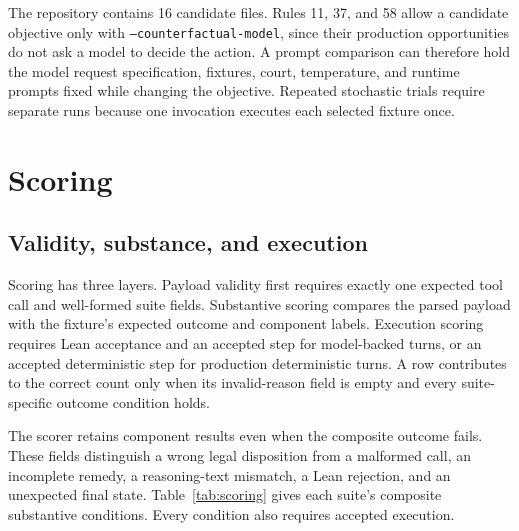 \documentclass[11pt]{article}
\newcommand{\code}[1]{\texttt{#1}}
\begin{document}
The repository contains 16 candidate files.  Rules 11, 37, and 58 allow a candidate objective only with \code{--counterfactual-model}, since their production opportunities do not ask a model to decide the action.  A prompt comparison can therefore hold the model request specification, fixtures, court, temperature, and runtime prompts fixed while changing the objective.  Repeated stochastic trials require separate runs because one invocation executes each selected fixture once.

\section{Scoring}

\subsection{Validity, substance, and execution}

Scoring has three layers.  Payload validity first requires exactly one expected tool call and well-formed suite fields.  Substantive scoring compares the parsed payload with the fixture's expected outcome and component labels.  Execution scoring requires Lean acceptance and an accepted step for model-backed turns, or an accepted deterministic step for production deterministic turns.  A row contributes to the correct count only when its invalid-reason field is empty and every suite-specific outcome condition holds.

The scorer retains component results even when the composite outcome fails.  These fields distinguish a wrong legal disposition from a malformed call, an incomplete remedy, a reasoning-text mismatch, a Lean rejection, and an unexpected final state.  Table~\ref{tab:scoring} gives each suite's composite substantive conditions.  Every condition also requires accepted execution.
\end{document}
